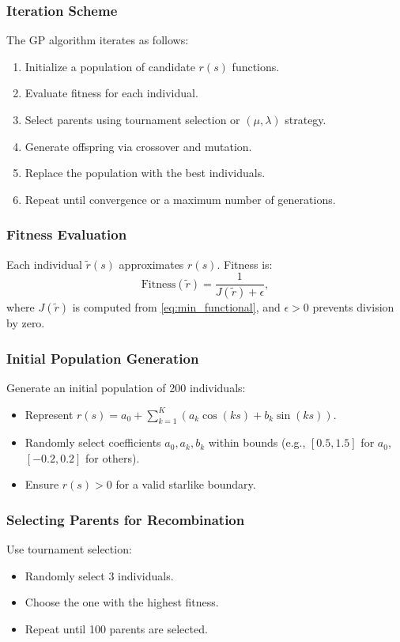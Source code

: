 \documentclass{beamer}
\begin{document}
\begin{frame}
    \frametitle{Iteration Scheme}
    The GP algorithm iterates as follows:
    \begin{enumerate}
        \item Initialize a population of candidate \( r(s) \) functions.
        \item Evaluate fitness for each individual.
        \item Select parents using tournament selection or \( (\mu, \lambda) \) strategy.
        \item Generate offspring via crossover and mutation.
        \item Replace the population with the best individuals.
        \item Repeat until convergence or a maximum number of generations.
    \end{enumerate}
\end{frame}

\begin{frame}
    \frametitle{Fitness Evaluation}
    Each individual \( \tilde{r}(s) \) approximates \( r(s) \). Fitness is:
    \begin{equation}
        \text{Fitness}(\tilde{r}) = \dfrac{1}{J(\tilde{r}) + \epsilon},
    \end{equation}
    where \( J(\tilde{r}) \) is computed from \eqref{eq:min_functional}, and \( \epsilon > 0 \) prevents division by zero.
\end{frame}

\begin{frame}
    \frametitle{Initial Population Generation}
    Generate an initial population of 200 individuals:
    \begin{itemize}
        \item Represent \( r(s) = a_0 + \sum_{k=1}^K (a_k \cos(ks) + b_k \sin(ks)) \).
        \item Randomly select coefficients \( a_0, a_k, b_k \) within bounds (e.g., \( [0.5, 1.5] \) for \( a_0 \), \( [-0.2, 0.2] \) for others).
        \item Ensure \( r(s) > 0 \) for a valid starlike boundary.
    \end{itemize}
\end{frame}

\begin{frame}
    \frametitle{Selecting Parents for Recombination}
    Use tournament selection:
    \begin{itemize}
        \item Randomly select 3 individuals.
        \item Choose the one with the highest fitness.
        \item Repeat until 100 parents are selected.
    \end{itemize}
\end{frame}
\end{document}
